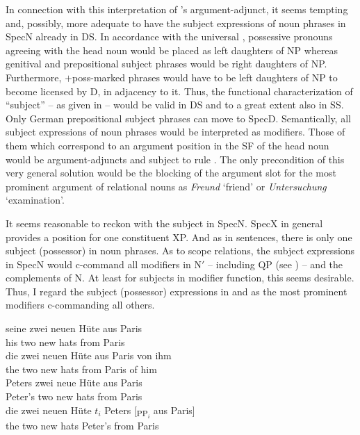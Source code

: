 \documentclass[output=paper,colorlinks,citecolor=brown]{langscibook}
\begin{document}
In connection with this interpretation of \citeauthor{Grimshaw88Adjuncts-and}'s argument-adjunct, it seems tempting and, possibly, more adequate to have the subject expressions of noun phrases in SpecN already in DS. In accordance with the universal , possessive pronouns agreeing with the head noun would be placed as left daughters of NP whereas genitival and prepositional subject phrases would be right daughters of NP. Furthermore, $+$poss-marked phrases would have to be left daughters of NP to become licensed by D, in adjacency to it. Thus, the functional characterization of “subject” -- as given in  -- would be valid in DS and to a great extent also in SS. Only German prepositional subject phrases can move to SpecD. Semantically, all subject expressions of noun phrases would be interpreted as modifiers. Those of them which correspond to an argument position in the SF of the head noun would be argument-adjuncts and subject to rule . The only precondition of this very general solution would be the blocking of the argument slot for the most prominent argument of relational nouns as \textit{Freund} `friend' or \textit{Untersuchung} `examination'.

It seems reasonable to reckon with the subject in SpecN. SpecX in general provides a position for one constituent XP. And as in sentences, there is only one subject (possessor) in noun phrases. As to scope relations, the subject expressions in SpecN would c-command all modifiers in N$'$ -- including QP (see ) -- and the complements of N. At least for subjects in modifier function, this seems desirable. Thus, I regard the subject (possessor) expressions in  and  as the most prominent modifiers c-commanding all others.

\ea \label{ex:zi91:71}
    \ea \label{ex:zi91:71a} 
    \gll seine zwei neuen Hüte aus Paris\\
    his two new hats from Paris\\
    \ex \label{ex:zi91:71b} 
    \gll die zwei neuen Hüte aus Paris von ihm\\
    the two new hats from Paris of him\\
    \z
\ex \label{ex:zi91:72}
    \ea \label{ex:zi91:72a} 
    \gll Peters zwei neue Hüte aus Paris\\
    Peter's two new hats from Paris\\
    
    \ex \label{ex:zi91:72b} 
    \gll die zwei neuen Hüte $t_{i}$ Peters [\textsubscript{PP$_i$} aus Paris]\\
   the two new hats {} Peter's {} from Paris\\
    \z
\z
\end{document}
